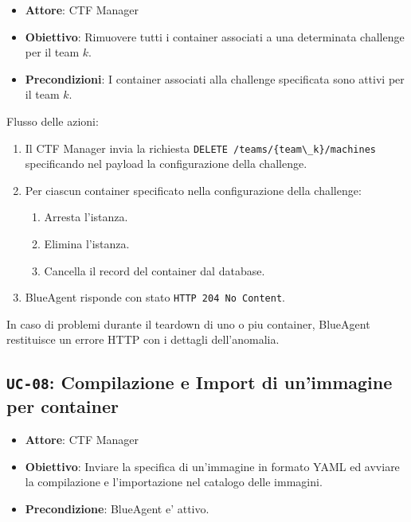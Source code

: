 \begin{itemize}
\tightlist
\item
  \textbf{Attore}: CTF Manager
\item
  \textbf{Obiettivo}: Rimuovere tutti i container associati a una
  determinata challenge per il team \(k\).
\item
  \textbf{Precondizioni}: I container associati alla challenge
  specificata sono attivi per il team \(k\).
\end{itemize}

Flusso delle azioni:

\begin{enumerate}
\def\labelenumi{\arabic{enumi}.}
\tightlist
\item
  Il CTF Manager invia la richiesta
  \passthrough{\lstinline!DELETE /teams/\{team\_k\}/machines!}
  specificando nel payload la configurazione della challenge.
\item
  Per ciascun container specificato nella configurazione della
  challenge:

  \begin{enumerate}
  \def\labelenumii{\arabic{enumii}.}
  \tightlist
  \item
    Arresta l'istanza.
  \item
    Elimina l'istanza.
  \item
    Cancella il record del container dal database.
  \end{enumerate}
\item
  BlueAgent risponde con stato
  \passthrough{\lstinline!HTTP 204 No Content!}.
\end{enumerate}

In caso di problemi durante il teardown di uno o piu container,
BlueAgent restituisce un errore HTTP con i dettagli dell'anomalia.

\subsection{\texorpdfstring{\texttt{UC-08}: Compilazione e Import di
un'immagine per
container}{UC-08: Compilazione e Import di un'immagine per container}}\label{uc-08-compilazione-e-import-di-unimmagine-per-container}

\begin{itemize}
\tightlist
\item
  \textbf{Attore}: CTF Manager
\item
  \textbf{Obiettivo}: Inviare la specifica di un'immagine in formato
  YAML ed avviare la compilazione e l'importazione nel catalogo delle
  immagini.
\item
  \textbf{Precondizione}: BlueAgent e' attivo.
\end{itemize}

